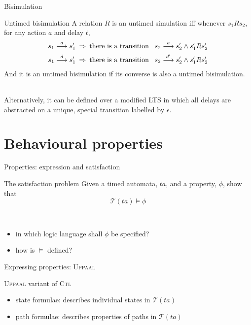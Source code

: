 \documentclass{beamer}
\def\dgold#1{{\darkgoldenrod #1}}
\def\dkb#1{{\blue #1}}
\def\TL#1{\mathcal{T}(#1)}
\begin{document}
\begin{slide}{Bisimulation}
\small

\begin{block}{Untimed bisimulation}
A relation $R$ is an \dkb{untimed simulation} iff whenever $s_1 R s_2$, for any action $a$ and delay $t$,
\begin{align*}
s_1 \stackrel{a}{\longrightarrow} s_1' \; & \mathbin{\Rightarrow}\; \text{there is a transition}\; \; \; s_2 \stackrel{a}{\longrightarrow} s_2' \mathbin{\wedge} s_1' R s_2'\\
s_1 \stackrel{d}{\longrightarrow} s_1'\; & \mathbin{\Rightarrow}\; \text{there is a transition}\; \; \; s_2 \stackrel{d'}{\longrightarrow} s_2' \mathbin{\wedge} s_1' R s_2'
\end{align*}
And it is an \dkb{untimed bisimulation} if its converse is also a  untimed bisimulation.
\end{block}
~\\


\dgold{Alternatively, it can be defined over a modified LTS in which all delays are abstracted on a 
unique, special transition labelled by $\epsilon$.}
\end{slide}



\section{Behavioural properties}
\begin{slide}{Properties: expression and satisfaction}
\small
\begin{block}{The satisfaction problem }
Given a \dgold{timed automata}, $ta$, and a \dkb{property}, $\phi$, show that
\begin{equation*}
\TL{ta} \models \phi
\end{equation*}
\end{block}
~\\

\pause
\begin{itemize}
\item in which logic language shall $\phi$ be specified?
\item how is $\models$ defined?
\end{itemize}
\end{slide}




\begin{slide}{Expressing properties: \textsc{Uppaal}}
\small

\begin{block}{\textsc{Uppaal} variant of \textsc{Ctl}}
\begin{itemize}
\item \dkb{state formulae}:  describes individual states in $\TL{ta}$
\item \dkb{path formulae}: describes properties of paths in $\TL{ta}$
\end{itemize}
\end{block}

\end{slide}
\end{document}
